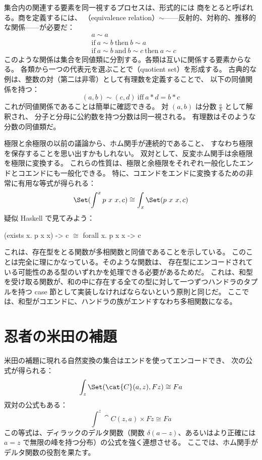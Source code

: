 集合内の関連する要素を同一視するプロセスは、形式的には
商をとると呼ばれる。商を定義するには、
（equivalence relation）$\sim$——反射的、対称的、推移的な関係——が必要だ：
\begin{align*}
   & a \sim a                                                         \\
   & \text{if}\ a \sim b\ \text{then}\ b \sim a                       \\
   & \text{if}\ a \sim b\ \text{and}\ b \sim c\ \text{then}\ a \sim c
\end{align*}
このような関係は集合を同値類に分割する。各類は互いに関係する要素からなる。
各類から一つの代表元を選ぶことで（quotient set）を形成する。
古典的な例は、整数の対（第二は非零）として有理数を定義することで、
以下の同値関係を持つ：
\[(a, b) \sim (c, d)\ \text{iff}\ a * d = b * c\]
これが同値関係であることは簡単に確認できる。
対 $(a, b)$ は分数 $\frac{a}{b}$ として解釈され、
分子と分母に公約数を持つ分数は同一視される。
有理数はそのような分数の同値類だ。

極限と余極限の以前の議論から、ホム関手が連続的であること、
すなわち極限を保存することを思い出すかもしれない。
双対として、反変ホム関手は余極限を極限に変換する。
これらの性質は、極限と余極限をそれぞれ一般化したエンドとコエンドにも一般化できる。
特に、コエンドをエンドに変換するための非常に有用な等式が得られる：
\[\Set(\int^x p\ x\ x, c) \cong \int_x \Set(p\ x\ x, c)\]
疑似 Haskell で見てみよう：

\begin{snipv}
(exists x. p x x) -> c \ensuremath{\cong} forall x. p x x -> c
\end{snipv}
これは、存在型をとる関数が多相関数と同値であることを示している。
このことは完全に理にかなっている。そのような関数は、
存在型にエンコードされている可能性のある型のいずれかを処理できる必要があるためだ。
これは、和型を受け取る関数が、和の中に存在する全ての型に対して一つずつハンドラのタプルを持つ
case 節として実装しなければならないという原則と同じだ。
ここでは、和型がコエンドに、ハンドラの族がエンドすなわち多相関数になる。

\section{忍者の米田の補題}

米田の補題に現れる自然変換の集合はエンドを使ってエンコードでき、
次の公式が得られる：
\[\int_z \Set(\cat{C}(a, z), F z) \cong F a\]
双対の公式もある：
\[\int^z \cat{C}(z, a)\times{}F z \cong F a\]
この等式は、ディラックのデルタ関数（関数 $\delta(a - z)$、あるいはより正確には
$a = z$ で無限の峰を持つ分布）の公式を強く連想させる。
ここでは、ホム関手がデルタ関数の役割を果たす。

